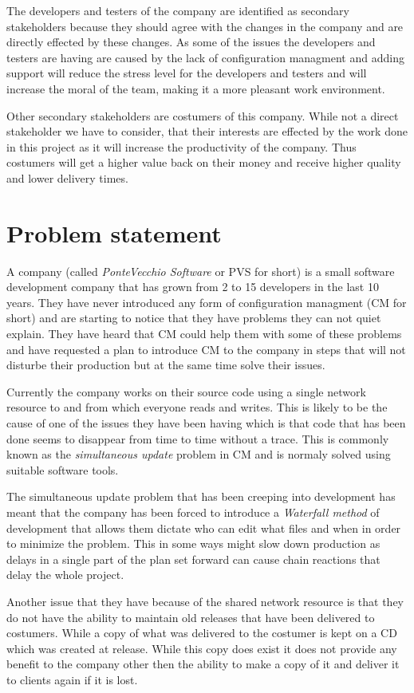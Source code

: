 \documentclass[a4paper]{article}
\begin{document}
The developers and testers of the company are identified as secondary stakeholders because they should agree with the changes in the company and are directly effected by these changes. As some of the issues the developers and testers are having are caused by the lack of configuration managment and adding support will reduce the stress level for the developers and testers and will increase the moral of the team, making it a more pleasant work environment.

Other secondary stakeholders are costumers of this company. While not a direct stakeholder we have to consider, that their interests are effected by the work done in this project as it will increase the productivity of the company. Thus costumers will get a higher value back on their money and receive higher quality and lower delivery times.

\section{Problem statement}
A company (called \emph{PonteVecchio Software} or PVS for short) is a small software development company that has grown from 2 to 15 developers in the last 10 years. They have never introduced any form of configuration managment (CM for short) and are starting to notice that they have problems they can not quiet explain. They have heard that CM could help them with some of these problems and have requested a plan to introduce CM to the company in steps that will not disturbe their production but at the same time solve their issues.

Currently the company works on their source code using a single network resource to and from which everyone reads and writes. This is likely to be the cause of one of the issues they have been having which is that code that has been done seems to disappear from time to time without a trace. This is commonly known as the \emph{simultaneous update} problem in CM and is normaly solved using suitable software tools.

The simultaneous update problem that has been creeping into development has meant that the company has been forced to introduce a \emph{Waterfall method} of development that allows them dictate who can edit what files and when in order to minimize the problem. This in some ways might slow down production as delays in a single part of the plan set forward can cause chain reactions that delay the whole project.

Another issue that they have because of the shared network resource is that they do not have the ability to maintain old releases that have been delivered to costumers. While a copy of what was delivered to the costumer is kept on a CD which was created at release. While this copy does exist it does not provide any benefit to the company other then the ability to make a copy of it and deliver it to clients again if it is lost.
\end{document}
